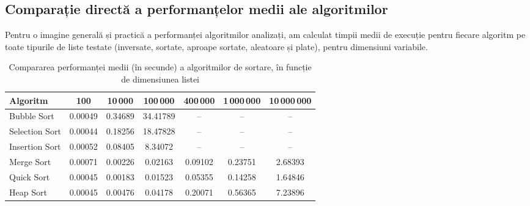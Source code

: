 \documentclass{article}
\begin{document}
\subsection{Comparație directă a performanțelor medii ale algoritmilor}

Pentru o imagine generală și practică a performanței algoritmilor analizați, am calculat timpii medii de execuție pentru fiecare algoritm pe toate tipurile de liste testate (inversate, sortate, aproape sortate, aleatoare și plate), pentru dimensiuni variabile.


\begin{table}[H]
\centering
\begin{tabular}{|l|c|c|c|c|c|c|}
\hline
\textbf{Algoritm}     & \textbf{100}   & \textbf{10\,000} & \textbf{100\,000} & \textbf{400\,000} & \textbf{1\,000\,000} & \textbf{10\,000\,000} \\
\hline
Bubble Sort           & 0.00049        & 0.34689          & 34.41789          & --                & --                  & --                   \\
Selection Sort        & 0.00044        & 0.18256          & 18.47828          & --                & --                  & --                   \\
Insertion Sort        & 0.00052        & 0.08405          & 8.34072           & --                & --                  & --                   \\
Merge Sort            & 0.00071        & 0.00226          & 0.02163           & 0.09102           & 0.23751             & 2.68393              \\
Quick Sort            & 0.00045        & 0.00183          & 0.01523           & 0.05355           & 0.14258             & 1.64846              \\
Heap Sort             & 0.00045        & 0.00476          & 0.04178           & 0.20071           & 0.56365             & 7.23896              \\
\hline
\end{tabular}
\caption{Compararea performanței medii (în secunde) a algoritmilor de sortare, în funcție de dimensiunea listei}
\label{tab:comparare-medii}
\end{table}
\end{document}
